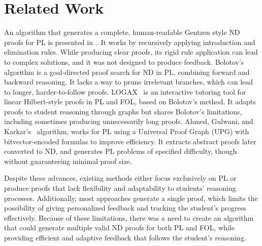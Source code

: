 \section{Related Work}
An algorithm that generates a complete, human-readable Gentzen style ND proofs for PL is presented in~\cite{makahu_automatic}. It works by recursively applying introduction and elimination rules. While producing clear proofs, its rigid rule application can lead to complex solutions, and it was not designed to produce feedback. Bolotov’s~\cite{bolotov_2005_automated} algorithm is a goal-directed proof search for ND in PL, combining forward and backward reasoning. It lacks a way to prune irrelevant branches, which can lead to longer, harder-to-follow proofs. LOGAX~\cite{lodder_2020_generation} is an interactive tutoring tool for linear Hilbert-style proofs in PL and FOL, based on Bolotov’s method. It adapts proofs to student reasoning through graphs but shares Bolotov’s limitations, including sometimes producing unnecessarily long proofs. Ahmed, Gulwani, and Karkar’s~\cite{IJCAI13} algorithm, works for PL using a Universal Proof Graph (UPG) with bitvector-encoded formulas to improve efficiency. It extracts abstract proofs later converted to ND, and generates PL problems of specified difficulty, though without guaranteeing minimal proof size.

Despite these advances, existing methods either focus exclusively on PL or produce proofs that lack flexibility and adaptability to students’ reasoning processes. Additionally, most approaches generate a single proof, which limits the possibility of giving personalized feedback and tracking the student’s progress effectively. Because of these limitations, there was a need to create an algorithm that could generate multiple valid ND proofs for both PL and FOL, while providing efficient and adaptive feedback that follows the student’s reasoning.


